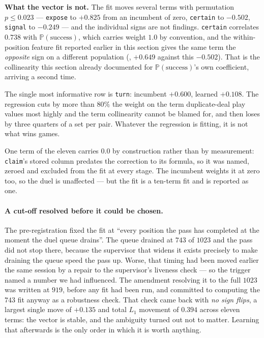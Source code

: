 \documentclass[11pt,a4paper]{article}
\newcommand{\Prob}{\ensuremath{\mathbb{P}}}
\begin{document}
\textbf{What the vector is not.} The fit moves several terms with permutation
$p \le 0.023$ --- \texttt{expose} to $+0.825$ from an incumbent of zero,
\texttt{certain} to $-0.502$, \texttt{signal} to $-0.249$ --- and the
individual signs are not findings. \texttt{certain} correlates $0.738$ with
$\Prob(\text{success})$, which carries weight $1.0$ by convention, and the
within-position feature fit reported earlier in this section gives the same
term the \emph{opposite} sign on a different population
(, $+0.649$ against this
$-0.502$). That is the collinearity this
section already documented for $\Prob(\text{success})$'s own coefficient,
arriving a second time.

The single most informative row is \texttt{turn}: incumbent $+0.600$, learned
$+0.108$. The regression cuts by more than $80\%$ the weight on the term
duplicate-deal play values most highly and the term collinearity cannot be
blamed for, and then loses by three quarters of a set per pair. Whatever the
regression is fitting, it is not what wins games.

One term of the eleven carries $0.0$ by construction rather than by
measurement: \texttt{claim}'s stored column predates the correction to its
formula, so it was named, zeroed and excluded from the fit at every stage. The
incumbent weights it at zero too, so the duel is unaffected --- but the fit is
a ten-term fit and is reported as one.

\paragraph{A cut-off resolved before it could be chosen.} The pre-registration
fixed the fit at ``every position the pass has completed at the moment the duel
queue drains''. The queue drained at $743$ of $1023$ and the pass did not stop
there, because the supervisor that widens it exists precisely to make draining
the queue speed the pass up. Worse, that timing had been moved earlier the same
session by a repair to the supervisor's liveness check --- so the trigger named
a number we had influenced. The amendment resolving it to the full $1023$ was
written at $919$, before any fit had been run, and committed to computing the
$743$ fit anyway as a robustness check. That check came back with \emph{no sign
flips}, a largest single move of $+0.135$ and total $L_1$ movement of $0.394$
across eleven terms: the vector is stable, and the ambiguity turned out not to
matter. Learning that afterwards is the only order in which it is worth
anything.
\end{document}
